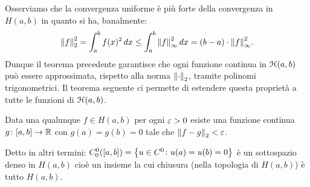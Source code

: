 Osserviamo che la convergenza uniforme è più forte della convergenza
in $H(a,b)$ in quanto si ha, banalmente:
\[
  {\left\Vert f\right\Vert}_2^2 = \int_a^b f(x)^2\, dx
  \le \int_a^b {\left\Vert f\right\Vert}_\infty^2\, dx
  = (b-a) \cdot {\left\Vert f\right\Vert}_\infty^2.
\]
Dunque il teorema precedente garantisce che ogni funzione continua
in $\mathcal H(a,b)$ può essere approssimata, rispetto alla norma ${\left\Vert \cdot\right\Vert}_2$,
tramite polinomi trigonometrici. Il teorema seguente ci permette
di estendere questa proprietà a tutte le funzioni di $\mathcal H(a,b)$.

\begin{theorem}
Data una qualunque $f\in H(a, b)$ per ogni $\varepsilon>0$
esiste una funzione continua $g\colon [a,b]\to {\mathbb R}$
con $g(a)=g(b)=0$ tale che ${\left\Vert f-g\right\Vert}_2<\varepsilon$.

Detto in altri termini: $C^0_0([a,b])={\left\{ u\in C^0\colon u(a)=u(b)=0 \right\}}$ è un 
sottospazio denso in $H(a,b)$
cioè un insieme la cui chiusura (nella topologia di $H(a,b)$) 
è tutto $H(a,b)$.
\end{theorem}
%
